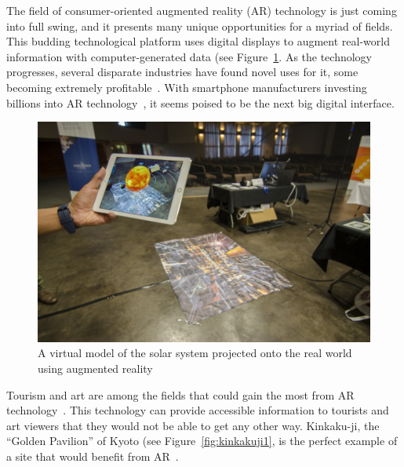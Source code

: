 \documentclass[a4paper, 10pt, american, titlepage]{article}
\begin{document}
The field of consumer-oriented augmented reality (AR) technology is just coming
into full swing, and it presents many unique opportunities for a myriad of
fields. This budding technological platform uses digital displays to augment
real-world information with computer-generated data (see
Figure~\ref{fig:arExample}. As the technology progresses, several disparate
industries have found novel uses for it, some becoming extremely
profitable~\autocite{webster2018}. With smartphone manufacturers investing
billions into AR technology~\autocite{mason2016}, it seems poised to be the next
big digital interface.

\begin{figure}[h]
	\centering
	\includegraphics[width=\textwidth]{ar-example.jpg}
	\caption[A virtual model of the solar system projected onto the real world
	using AR]{A virtual model of the solar system projected onto the real world
		using augmented reality~\autocite{tedx2016}}
	\label{fig:arExample}
\end{figure}

Tourism and art are among the fields that could gain the most from AR
technology~\autocite{saenz2009, katz2018}. This technology can provide
accessible information to tourists and art viewers that they would not be able
to get any other way. Kinkaku-ji, the ``Golden Pavilion'' of Kyoto (see
Figure~\ref{fig:kinkakuji1}, is the perfect example of a site that would benefit
from AR~\autocite{bornoff2000}.
\end{document}
